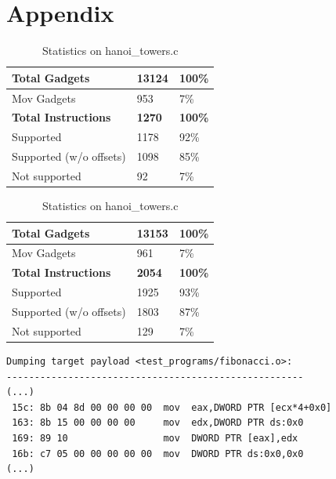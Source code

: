 \documentclass[10pt,twocolumn]{article}
\begin{document}
\appendix
\clearpage
\section{Appendix}
\label{appendix:a}
\begin{table}[!ht]
  \centering
  
  \medskip

  \begin{tabular}{l|l|l}
    \textbf{Total Gadgets}      & \textbf{13124} & \textbf{100\%} \\ \hline
    Mov Gadgets                 & 953           &  7\%           \\
    \textbf{Total Instructions} & \textbf{1270} & \textbf{100\%} \\ \hline
    Supported                   & 1178          & 92\%           \\ \hline
    Supported (w/o offsets)     & 1098          & 85\%           \\ \hline
    Not supported               & 92            &  7\%          
  \end{tabular}%
  \label{result-fibo}
  \caption{Statistics on fibonacci.c}

  \bigskip

  
  \medskip

  \begin{tabular}{l|l|l}
    \textbf{Total Gadgets}      & \textbf{13153} & \textbf{100\%} \\ \hline
    Mov Gadgets                 & 961           & 7\%           \\
    \textbf{Total Instructions} & \textbf{2054} & \textbf{100\%} \\ \hline
    Supported                   & 1925          & 93\%           \\ \hline
    Supported (w/o offsets)     & 1803          & 87\%           \\ \hline
    Not supported               & 129           & 7\%          
  \end{tabular}%
  \label{result-hanoi}
  \caption{Statistics on hanoi\_towers.c}
\end{table}

\begin{lstlisting}[float, caption=Sample movfuscator output]
Dumping target payload <test_programs/fibonacci.o>:
-----------------------------------------------------
(...)
 15c: 8b 04 8d 00 00 00 00  mov  eax,DWORD PTR [ecx*4+0x0]
 163: 8b 15 00 00 00 00     mov  edx,DWORD PTR ds:0x0
 169: 89 10                 mov  DWORD PTR [eax],edx
 16b: c7 05 00 00 00 00 00  mov  DWORD PTR ds:0x0,0x0
(...)
\end{lstlisting}


\end{document}
